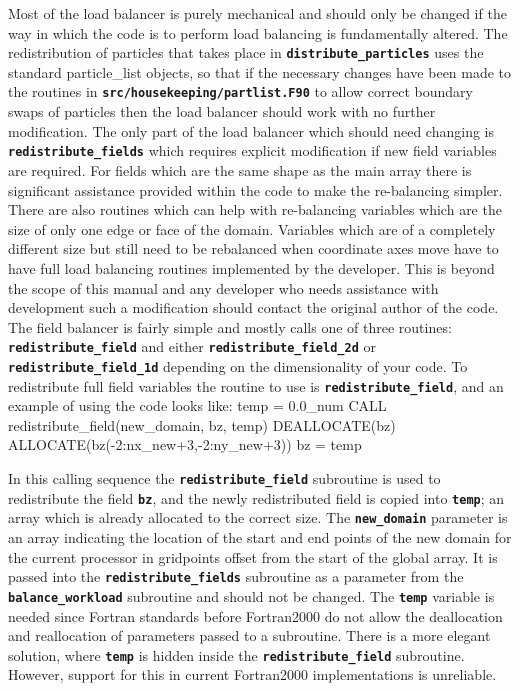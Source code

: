 \documentclass[12pt,a4paper]{article}
\newcommand{\inlinecode}[1]{{\color{warwickred} \bf\texttt{#1}}}
\newenvironment{boxverbatim}{\lboxverbatim{none}}{\endlboxverbatim}
\begin{document}
Most of the load balancer is purely mechanical and should only be changed if
the way in which the code is to perform load balancing is fundamentally
altered. The redistribution of particles that takes place in
\inlinecode{distribute\_particles} uses the standard particle\_list objects, so
that if the necessary changes have been made to the routines in
\inlinecode{src/housekeeping/partlist.F90} to allow correct
boundary swaps of particles then the load balancer should work with no further
modification. The only part of the load balancer which should need changing is
\inlinecode{redistribute\_fields} which requires explicit modification if new
field variables are required. For fields which are the same shape as the main
array there is significant assistance provided within the code to make the
re-balancing simpler. There are also routines which can help with re-balancing
variables which are the size of only one edge or face of the domain. Variables
which are of a completely different size but still need to be rebalanced when
coordinate axes move have to have full load balancing routines implemented by
the developer. This is beyond the scope of this manual and any developer who
needs assistance with development such a modification should contact the original
author of the code. The field balancer is fairly simple and mostly calls one of
three routines: \inlinecode{redistribute\_field} and either
\inlinecode{redistribute\_field\_2d} or \inlinecode{redistribute\_field\_1d}
depending on the dimensionality of your code. To redistribute full field
variables the routine to use is \inlinecode{redistribute\_field}, and an
example of using the code looks like:
\begin{boxverbatim}
  temp = 0.0_num
  CALL redistribute_field(new_domain, bz, temp)
  DEALLOCATE(bz)
  ALLOCATE(bz(-2:nx_new+3,-2:ny_new+3))
  bz = temp
\end{boxverbatim}

In this calling sequence the
\inlinecode{redistribute\_field} subroutine is used to redistribute the field
\inlinecode{bz}, and the newly redistributed field is copied
into \inlinecode{temp}; an array which is already allocated to the
correct size. The \inlinecode{new\_domain} parameter is an array indicating the
location of the start and end points of the new domain for the current processor
in gridpoints offset from the start of the global array. It is passed into the
\inlinecode{redistribute\_fields} subroutine as a parameter from the
\inlinecode{balance\_workload} subroutine and should not be changed. The
\inlinecode{temp} variable is needed since Fortran standards before Fortran2000
do not allow the deallocation and reallocation of parameters passed to a
subroutine. There is a more elegant solution, where \inlinecode{temp} is
hidden inside the \inlinecode{redistribute\_field} subroutine. However, support
for this in current Fortran2000 implementations is unreliable.\\
\end{document}

